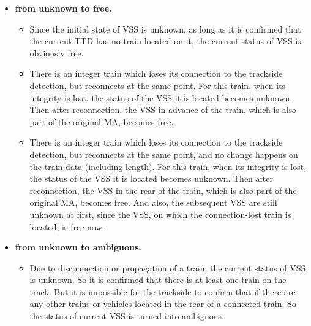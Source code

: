 \documentclass[article,dr=phil,type=msc,colorback,accentcolor=tud9c]{tudthesis}
\begin{document}
  \begin{itemize}
	
	\item \textbf{from unknown to free.}
	
	\begin{itemize}
		
		\item 
		
		Since the initial state of VSS is unknown, as long as it is confirmed that the current TTD has no train located on it, the current status of VSS is obviously free.
		
		\item 
		
		There is an integer train which loses its connection to the trackside detection, but reconnects at the same point. For this train, when its integrity is lost, the status of the VSS it is located becomes unknown. Then after reconnection, the VSS in advance of the train, which is also part of the original MA, becomes free.
		
		\item 
		
		There is an integer train which loses its connection to the trackside detection, but reconnects at the same point, and no change happens on the train data (including length). For this train, when its integrity is lost, the status of the VSS it is located becomes unknown. Then after reconnection, the VSS in the rear of the train, which is also part of the original MA, becomes free. And also, the subsequent VSS are still unknown at first, since the VSS, on which the connection-lost train is located, is free now.
		
	\end{itemize}  	
	
	\item \textbf{from unknown to ambiguous.}
	
	\begin{itemize}
		
		\item 
		
		Due to disconnection or propagation of a train, the current status of VSS is unknown. So it is confirmed that there is at least one train on the track. But it is impossible for the trackside to confirm that if there are any other trains or vehicles located in the rear of a connected train. So the status of current VSS is turned into ambiguous.
		
	\end{itemize} 
	

\end{itemize}
\end{document}
